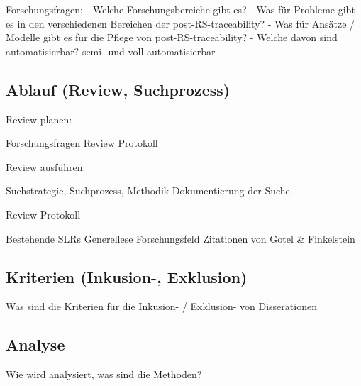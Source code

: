 Forschungsfragen:
- Welche Forschungsbereiche gibt es?
- Was für Probleme gibt es in den verschiedenen Bereichen der post-RS-traceability?
- Was für Ansätze / Modelle gibt es für die Pflege von post-RS-traceability?
- Welche davon sind automatisierbar? semi- und voll automatisierbar

\subsection{Ablauf (Review, Suchprozess)}

Review planen:

Forschungsfragen
Review Protokoll

Review ausführen:

Suchstrategie, Suchprozess, Methodik
Dokumentierung der Suche

Review Protokoll

Bestehende SLRs
Generellese Forschungsfeld
Zitationen von Gotel \& Finkelstein

\subsection{Kriterien (Inkusion-, Exklusion)}

Was sind die Kriterien für die Inkusion- / Exklusion- von Disserationen

\subsection{Analyse}

Wie wird analysiert, was sind die Methoden?